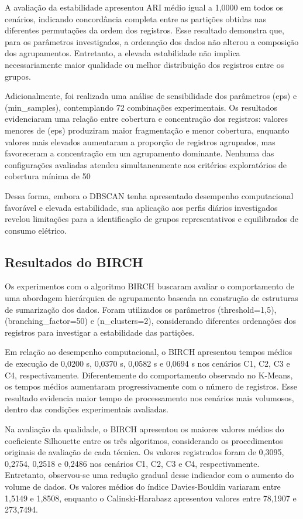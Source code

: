 \documentclass[lettersize,journal]{IEEEtran}
\begin{document}
A avaliação da estabilidade apresentou ARI médio igual a 1,0000 em todos os cenários, indicando concordância completa entre as partições obtidas nas diferentes permutações da ordem dos registros. Esse resultado demonstra que, para os parâmetros investigados, a ordenação dos dados não alterou a composição dos agrupamentos. Entretanto, a elevada estabilidade não implica necessariamente maior qualidade ou melhor distribuição dos registros entre os grupos.

Adicionalmente, foi realizada uma análise de sensibilidade dos parâmetros (eps) e (min\_samples), contemplando 72 combinações experimentais. Os resultados evidenciaram uma relação entre cobertura e concentração dos registros: valores menores de (eps) produziram maior fragmentação e menor cobertura, enquanto valores mais elevados aumentaram a proporção de registros agrupados, mas favoreceram a concentração em um agrupamento dominante. Nenhuma das configurações avaliadas atendeu simultaneamente aos critérios exploratórios de cobertura mínima de 50%

Dessa forma, embora o DBSCAN tenha apresentado desempenho computacional favorável e elevada estabilidade, sua aplicação aos perfis diários investigados revelou limitações para a identificação de grupos representativos e equilibrados de consumo elétrico.

\subsection{Resultados do BIRCH}
Os experimentos com o algoritmo BIRCH buscaram avaliar o comportamento de uma abordagem hierárquica de agrupamento baseada na construção de estruturas de sumarização dos dados. Foram utilizados os parâmetros (threshold=1,5), (branching\_factor=50) e (n\_clusters=2), considerando diferentes ordenações dos registros para investigar a estabilidade das partições.

Em relação ao desempenho computacional, o BIRCH apresentou tempos médios de execução de 0,0200 s, 0,0370 s, 0,0582 s e 0,0694 s nos cenários C1, C2, C3 e C4, respectivamente. Diferentemente do comportamento observado no K-Means, os tempos médios aumentaram progressivamente com o número de registros. Esse resultado evidencia maior tempo de processamento nos cenários mais volumosos, dentro das condições experimentais avaliadas.

Na avaliação da qualidade, o BIRCH apresentou os maiores valores médios do coeficiente Silhouette entre os três algoritmos, considerando os procedimentos originais de avaliação de cada técnica. Os valores registrados foram de 0,3095, 0,2754, 0,2518 e 0,2486 nos cenários C1, C2, C3 e C4, respectivamente. Entretanto, observou-se uma redução gradual desse indicador com o aumento do volume de dados. Os valores médios do índice Davies-Bouldin variaram entre 1,5149 e 1,8508, enquanto o Calinski-Harabasz apresentou valores entre 78,1907 e 273,7494.
\end{document}

